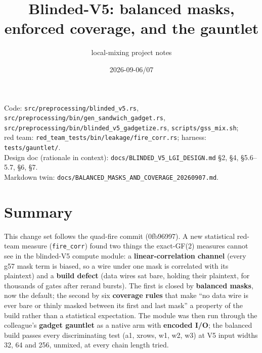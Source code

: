 \documentclass[11pt]{article}
\title{Blinded-V5: balanced masks, enforced coverage, and the gauntlet}
\author{local-mixing project notes}
\date{2026-09-06/07}
\newcommand{\doc}[1]{\texttt{#1}}
\newcommand{\g}{\textsf{g57}}
\begin{document}
\sloppy
\maketitle

\noindent Code: \doc{src/preprocessing/blinded\_v5.rs}, \doc{src/preprocessing/bin/gen\_sandwich\_gadget.rs},\\
\doc{src/preprocessing/bin/blinded\_v5\_gadgetize.rs}, \doc{scripts/gss\_mix.sh};\\
red team: \doc{red\_team\_tests/bin/leakage/fire\_corr.rs}; harness: \doc{tests/gauntlet/}.\\
Design doc (rationale in context): \doc{docs/BLINDED\_V5\_LGI\_DESIGN.md} \S2, \S4, \S5.6--5.7, \S6, \S7.\\
Markdown twin: \doc{docs/BALANCED\_MASKS\_AND\_COVERAGE\_20260907.md}.

\section*{Summary}

This change set follows the quad-fire commit (0fb96997). A new statistical red-team measure
(\doc{fire\_corr}) found two things the exact-GF(2) measures cannot see in the blinded-V5
compute module: a \textbf{linear-correlation channel} (every \g{} mask term is biased, so a
wire under one mask is correlated with its plaintext) and a \textbf{build defect} (data wires
sat bare, holding their plaintext, for thousands of gates after rerand bursts). The first is
closed by \textbf{balanced masks}, now the default; the second by six \textbf{coverage rules}
that make ``no data wire is ever bare or thinly masked between its first and last mask'' a
property of the build rather than a statistical expectation. The module was then run through
the colleague's \textbf{gadget gauntlet} as a native arm with \textbf{encoded I/O}; the
balanced build passes every discriminating test (a1, xrows, w1, w2, w3) at V5 input widths
32, 64 and 256, unmixed, at every chain length tried.
\end{document}
